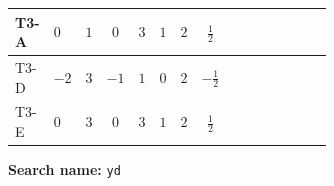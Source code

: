 \documentclass[8pt]{article}
\begin{document}
\begin{landscape}
\begin{longtable}{@{}llcccccc >{\raggedright\arraybackslash}p{0.21\linewidth} >{\raggedright\arraybackslash}p{0.21\linewidth} >{\raggedright\arraybackslash}p{0.21\linewidth}@{}}
\midrule
T3-A & $0$ & $1$ & $0$ & $3$ & $1$ & $2$ & $\frac{1}{2}$ & \scriptsize\adjustbox{max width=\linewidth}{$\begin{gathered} +\frac{3}{2} (\left({Y_d}\,\left({Y_d}\right)^{\dagger}\,{Y_d}\right)_{ij}-\left({Y_u}\,\left({Y_u}\right)^{\dagger}\,{Y_d}\right)_{ij})\end{gathered}$} & \scriptsize\adjustbox{max width=\linewidth}{$\begin{gathered} -\frac{9}{4} {g_2}^2 \left({Y_d}\right)_{ij}\end{gathered}$} & \scriptsize\adjustbox{max width=\linewidth}{$\begin{gathered} -8 {g_3}^2 \left({Y_d}\right)_{ij}\end{gathered}$} \\
\midrule
T3-D & $-2$ & $3$ & $-1$ & $1$ & $0$ & $2$ & $-\frac{1}{2}$ & \scriptsize\adjustbox{max width=\linewidth}{$\begin{gathered} +\frac{3}{2} (\left({Y_d}\,\left({Y_d}\right)^{\dagger}\,{Y_d}\right)_{ij}-\left({Y_u}\,\left({Y_u}\right)^{\dagger}\,{Y_d}\right)_{ij})\end{gathered}$} & \scriptsize\adjustbox{max width=\linewidth}{$\begin{gathered} -\frac{9}{4} {g_2}^2 \left({Y_d}\right)_{ij}\end{gathered}$} & \scriptsize\adjustbox{max width=\linewidth}{$\begin{gathered} -8 {g_3}^2 \left({Y_d}\right)_{ij}\end{gathered}$} \\
\midrule
T3-E & $0$ & $3$ & $0$ & $3$ & $1$ & $2$ & $\frac{1}{2}$ & \scriptsize\adjustbox{max width=\linewidth}{$\begin{gathered} +\frac{3}{2} (\left({Y_d}\,\left({Y_d}\right)^{\dagger}\,{Y_d}\right)_{ij}-\left({Y_u}\,\left({Y_u}\right)^{\dagger}\,{Y_d}\right)_{ij})\end{gathered}$} & \scriptsize\adjustbox{max width=\linewidth}{$\begin{gathered} -\frac{9}{4} {g_2}^2 \left({Y_d}\right)_{ij}\end{gathered}$} & \scriptsize\adjustbox{max width=\linewidth}{$\begin{gathered} -8 {g_3}^2 \left({Y_d}\right)_{ij}\end{gathered}$} \\
\midrule
\bottomrule
\end{longtable}
\clearpage
\noindent\textbf{Search name: }\texttt{yd}\par\smallskip

\end{landscape}
\end{document}
